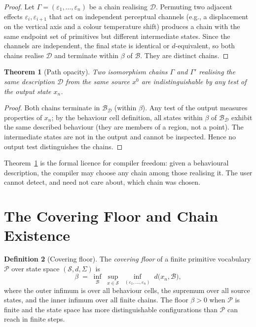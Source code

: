 \documentclass[twocolumn,11pt,a4paper]{article}
\theoremstyle{mee}
\newtheorem{theorem}{Theorem}[section]
\theoremstyle{definition}
\newtheorem{definition}[theorem]{Definition}
\theoremstyle{remark}
\newcommand{\State}{\mathcal{S}}
\newcommand{\BState}{\mathcal{B}}
\newcommand{\floor}{\beta}
\newcommand{\Eff}{\varepsilon}
\newcommand{\Chain}{\Gamma}
\newcommand{\src}{x^{0}}
\newcommand{\Desc}{\mathcal{D}}
\newcommand{\Phys}{\mathcal{P}}
\newcommand{\dist}{d}
\newcommand{\Sig}{\Sigma}
\begin{document}
\begin{proof}
Let $\Chain=(\Eff_1,\dots,\Eff_n)$ be a chain realising $\Desc$.
Permuting two adjacent effects $\Eff_i,\Eff_{i+1}$ that act on
independent perceptual channels (e.g., a displacement on the vertical
axis and a colour temperature shift) produces a chain with the same
endpoint set of primitives but different intermediate states. Since the
channels are independent, the final state is identical or
$\dist$-equivalent, so both chains realise $\Desc$ and terminate within
$\floor$ of $\BState$. They are distinct chains.
\end{proof}

\begin{theorem}[Path opacity]
\label{thm:opacity}
Two isomorphism chains $\Chain$ and $\Chain'$ realising the same
description $\Desc$ from the same source $\src$ are indistinguishable by
any test of the output state $x_n$.
\end{theorem}

\begin{proof}
Both chains terminate in $\BState_\Desc$ (within $\floor$). Any
test of the output measures properties of $x_n$; by the behaviour cell
definition, all states within $\floor$ of $\BState_\Desc$ exhibit the
same described behaviour (they are members of a region, not a point). The
intermediate states are not in the output and cannot be inspected. Hence
no output test distinguishes the chains.
\end{proof}

Theorem~\ref{thm:opacity} is the formal licence for compiler freedom:
given a behavioural description, the compiler may choose any chain among
those realising it. The user cannot detect, and need not care about, which
chain was chosen.

\section{The Covering Floor and Chain Existence}
\label{sec:floor}

\begin{definition}[Covering floor]
\label{def:floor}
The \emph{covering floor} of a finite primitive vocabulary $\Phys$ over
state space $(\State,\dist,\Sig)$ is
\[
  \floor \;=\; \inf_{\BState}\;\sup_{x\in\State}\;
  \inf_{(\Eff_1,\dots,\Eff_n)}\;\dist\!\bigl(x_n,\BState\bigr),
\]
where the outer infimum is over all behaviour cells, the supremum over
all source states, and the inner infimum over all finite chains. The floor
$\floor>0$ when $\Phys$ is finite and the state space has more
distinguishable configurations than $\Phys$ can reach in finite steps.
\end{definition}
\end{document}
